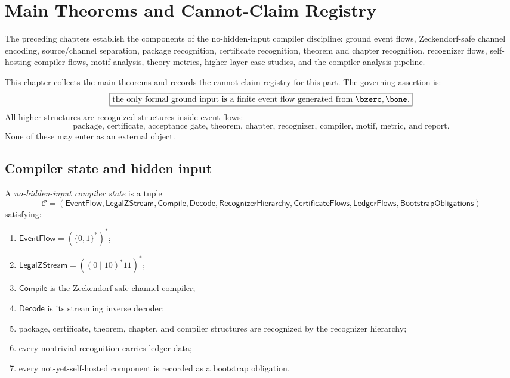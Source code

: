 \chapter{Main Theorems and Cannot-Claim Registry}
\label{ch:ground-compiler-main-theorems-cannot-claims}

The preceding chapters establish the components of the no-hidden-input compiler discipline: ground event flows, Zeckendorf-safe channel encoding, source/channel separation, package recognition, certificate recognition, theorem and chapter recognition, recognizer flows, self-hosting compiler flows, motif analysis, theory metrics, higher-layer case studies, and the compiler analysis pipeline.

This chapter collects the main theorems and records the cannot-claim registry for this part. The governing assertion is:
$$
  \boxed{\text{the only formal ground input is a finite event flow generated from }\bzero,\bone.}
$$
All higher structures are recognized structures inside event flows:
$$
\text{package, certificate, acceptance gate, theorem, chapter, recognizer, compiler, motif, metric, and report}.
$$
None of these may enter as an external object.

\section{Compiler state and hidden input}
\label{sec:main-theorems-compiler-state-hidden-input}

\begin{definition}
\label{def:main-theorems-no-hidden-input-state}
A \emph{no-hidden-input compiler state} is a tuple
$$
  \mathcal C =
  (\mathsf{EventFlow},
   \mathsf{LegalZStream},
   \mathsf{Compile},
   \mathsf{Decode},
   \mathsf{RecognizerHierarchy},
   \mathsf{CertificateFlows},
   \mathsf{LedgerFlows},
   \mathsf{BootstrapObligations})
$$
satisfying:
\begin{enumerate}
\item $\mathsf{EventFlow}=(\{0,1\}^{\ast})^{\ast}$;
\item $\mathsf{LegalZStream}=((0\mid 10)^{\ast}11)^{\ast}$;
\item $\mathsf{Compile}$ is the Zeckendorf-safe channel compiler;
\item $\mathsf{Decode}$ is its streaming inverse decoder;
\item package, certificate, theorem, chapter, and compiler structures are recognized by the recognizer hierarchy;
\item every nontrivial recognition carries ledger data;
\item every not-yet-self-hosted component is recorded as a bootstrap obligation.
\end{enumerate}
\end{definition}

